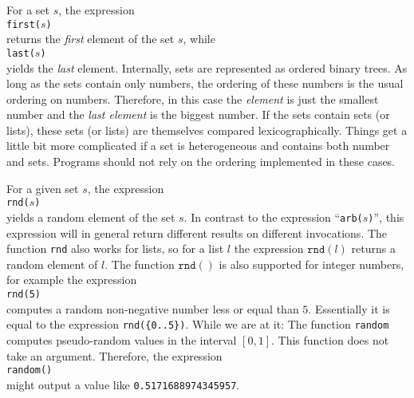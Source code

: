 For a set $s$,  the expression 
\\[0.2cm]
\hspace*{1.3cm}
\texttt{first($s$)}
\\[0.2cm]
returns the \emph{first} element of the set $s$, while
\\[0.2cm]
\hspace*{1.3cm}
\texttt{last($s$)} 
\\[0.2cm]
yields the \emph{last} element.  Internally, sets are represented as ordered binary trees.  As long
as the sets contain only numbers, the ordering of these numbers is the usual ordering on
numbers. Therefore, in this case the \emph{element} is just the smallest number and the 
\emph{last element} is the biggest number.  If the sets contain sets (or lists), these sets (or
lists) are themselves compared lexicographically.  
Things get a little bit more complicated if a set is heterogeneous and contains both number and sets.
Programs should not rely on the ordering implemented in these cases.

For a given set $s$, the expression
\\[0.2cm]
\hspace*{1.3cm}
\texttt{rnd($s$)}
\\[0.2cm]
yields a random element of the set $s$.  
In contrast to the expression
``\texttt{arb($s$)}'',  this expression will in general return different results on
different invocations.  The function \texttt{rnd} also works for lists, so for a list $l$
the expression $\texttt{rnd}(l)$ returns a random element of $l$.
The function $\mathtt{rnd}()$ is also supported for integer numbers, for example the expression
\\[0.2cm]
\hspace*{1.3cm}
\texttt{rnd(5)}
\\[0.2cm]
computes a random non-negative number less or equal than $5$. Essentially it is equal to the expression
\texttt{rnd(\{0..5\})}.  While we are at it: The function \texttt{random} computes pseudo-random
values in the interval $[0,1]$.  This function does not take an argument. Therefore, the expression
\\[0.2cm]
\hspace*{1.3cm}
\texttt{random()}
\\[0.2cm]
might output a value like \texttt{0.5171688974345957}. 


